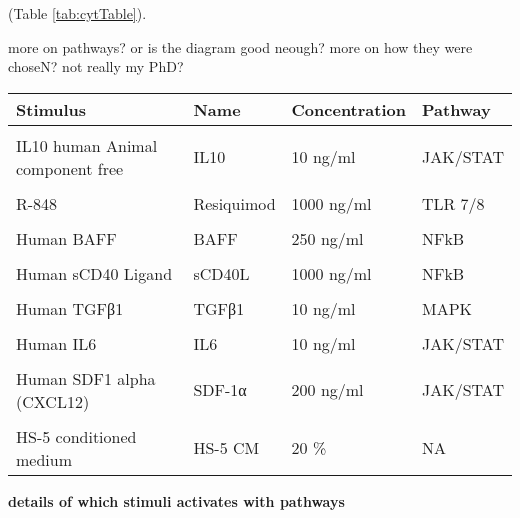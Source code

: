 \documentclass[11pt, a4paper, twosided]{book}
\begin{document}
(Table \ref{tab:cytTable}).



more on pathways? or is the diagram good neough? more on how they were choseN? not really my PhD?
\begin{table}
\centering
\begin{tabular}{l|l|l|l}
\hline
\textbf{Stimulus} & \textbf{Name} & \textbf{Concentration} & \textbf{Pathway}\\
\hline
\cellcolor[HTML]{E2E868}{IL4 human recombinant animal component free} & \cellcolor[HTML]{E2E868}{IL4} & \cellcolor[HTML]{E2E868}{10 ng/ml} & \cellcolor[HTML]{E2E868}{JAK/STAT}\\
\hline
IL10 human Animal component free & IL10 & 10 ng/ml & JAK/STAT\\
\hline
\cellcolor[HTML]{E2E868}{IL2 human recombinant animal component free} & \cellcolor[HTML]{E2E868}{IL2} & \cellcolor[HTML]{E2E868}{10 ng/ml} & \cellcolor[HTML]{E2E868}{JAK/STAT}\\
\hline
R-848 & Resiquimod & 1000 ng/ml & TLR 7/8\\
\hline
\cellcolor[HTML]{E2E868}{Human IL-21} & \cellcolor[HTML]{E2E868}{IL21} & \cellcolor[HTML]{E2E868}{10 ng/ml} & \cellcolor[HTML]{E2E868}{JAK/STAT}\\
\hline
Human BAFF & BAFF & 250 ng/ml & NFkB\\
\hline
\cellcolor[HTML]{E2E868}{Human IL-1 beta} & \cellcolor[HTML]{E2E868}{IL1β} & \cellcolor[HTML]{E2E868}{10 ng/ml} & \cellcolor[HTML]{E2E868}{NFkB}\\
\hline
Human sCD40 Ligand & sCD40L & 1000 ng/ml & NFkB\\
\hline
\cellcolor[HTML]{E2E868}{Goat F(AB')2 Fragment to human IgM} & \cellcolor[HTML]{E2E868}{soluble anti-IgM} & \cellcolor[HTML]{E2E868}{20000 ng/ml} & \cellcolor[HTML]{E2E868}{BCR}\\
\hline
Human TGFβ1 & TGFβ1 & 10 ng/ml & MAPK\\
\hline
\cellcolor[HTML]{E2E868}{Human IL15} & \cellcolor[HTML]{E2E868}{IL15} & \cellcolor[HTML]{E2E868}{10 ng/ml} & \cellcolor[HTML]{E2E868}{JAK/STAT}\\
\hline
Human IL6 & IL6 & 10 ng/ml & JAK/STAT\\
\hline
\cellcolor[HTML]{E2E868}{ODN 2006 (ODN 7909)} & \cellcolor[HTML]{E2E868}{CpG ODN} & \cellcolor[HTML]{E2E868}{1000 ng/ml} & \cellcolor[HTML]{E2E868}{TLR 9}\\
\hline
Human SDF1 alpha (CXCL12) & SDF-1α & 200 ng/ml & JAK/STAT\\
\hline
\cellcolor[HTML]{E2E868}{Human Interferon gamma} & \cellcolor[HTML]{E2E868}{Interferon γ} & \cellcolor[HTML]{E2E868}{5 ng/ml} & \cellcolor[HTML]{E2E868}{NFkB}\\
\hline
HS-5 conditioned medium & HS-5 CM & 20 \% & NA\\
\hline
\end{tabular}
\end{table}
\textbf{details of which stimuli activates with pathways}
\end{document}

